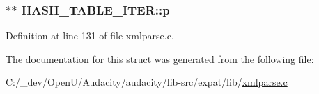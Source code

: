 \subsubsection[{\texorpdfstring{p}{p}}]{$\ast$$\ast$ H\+A\+S\+H\+\_\+\+T\+A\+B\+L\+E\+\_\+\+I\+T\+E\+R\+::p}\hypertarget{struct_h_a_s_h___t_a_b_l_e___i_t_e_r_a7d68e32e21c52fb62f27b9de92f5dafe}{}\label{struct_h_a_s_h___t_a_b_l_e___i_t_e_r_a7d68e32e21c52fb62f27b9de92f5dafe}


Definition at line 131 of file xmlparse.\+c.



The documentation for this struct was generated from the following file\+:\begin{DoxyCompactItemize}
\item 
C\+:/\+\_\+dev/\+Open\+U/\+Audacity/audacity/lib-\/src/expat/lib/\hyperlink{xmlparse_8c}{xmlparse.\+c}\end{DoxyCompactItemize}
